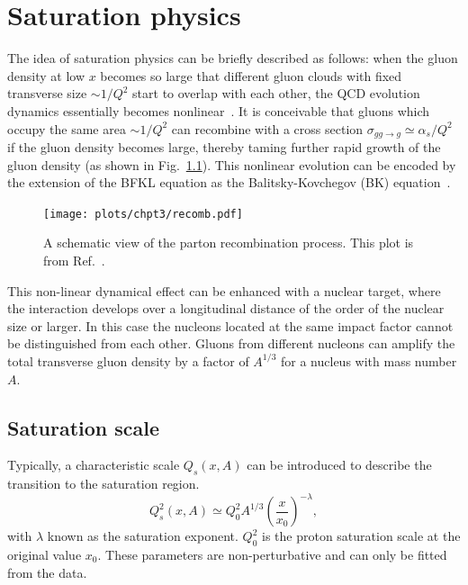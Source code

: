 \chapter{Saturation physics}
\label{chp:saturation}

The idea of saturation physics can be briefly described as follows: when the
gluon density at low $x$ becomes so large that different gluon clouds with fixed
transverse size $\sim 1/Q^{2}$ start to overlap with each other, the QCD
evolution dynamics essentially becomes nonlinear~\cite{Gribov:1984tu,Mueller:1985wy}. 
It is conceivable that gluons which occupy the same area $\sim 1/Q^{2}$ can recombine with a cross section $\sigma_{gg\rightarrow g}\simeq \alpha_{s}/Q^{2}$ if the gluon density becomes large, thereby taming further
rapid growth of the gluon density (as shown in Fig.~\ref{fig:recombine}). This nonlinear evolution can be encoded by the extension of the BFKL
equation as the Balitsky-Kovchegov (BK) equation~\cite{Balitsky:1995ub}.
\begin{figure}
\centering
\texttt{[image: plots/chpt3/recomb.pdf]}
\caption[Parton recombination]{
A schematic view of the parton recombination process. This plot is from Ref.~\cite{Accardi:2012qut}.}
\label{fig:recombine}
\end{figure}

This non-linear dynamical effect can be enhanced with a nuclear target, where the
interaction develops over a longitudinal distance of the order of the nuclear size
or larger. 
In this case the nucleons located at the same impact factor
cannot be distinguished from each other. Gluons from different nucleons can
amplify the total transverse gluon density by a factor of $A^{1/3}$ for a
nucleus with mass number $A$. 

\section{Saturation scale}
Typically, a characteristic scale $Q_{s}(x,A)$ can
be introduced to describe the transition to the saturation region. 
\begin{equation}
Q^{2}_{s}(x,A)\simeq Q^{2}_{0}A^{1/3}(\frac{x}{x_{0}})^{-\lambda},
\label{eqn:sat_scale}
\end{equation}
with $\lambda$ known as the saturation exponent. $Q^{2}_{0}$ is the proton
saturation scale at the original value $x_{0}$. These parameters are
non-perturbative and can only be fitted from the data.


